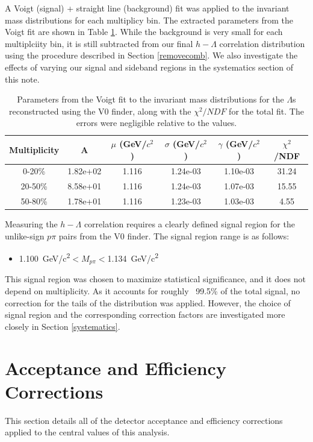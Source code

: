 \documentclass[ALICE,manyauthors]{ALICE_analysis_notes}
\begin{document}
 A Voigt (signal) + straight line (background) fit was applied to the invariant mass distributions for each multiplicy bin. The extracted parameters from the Voigt fit are shown in Table \ref{voigt_parameters}. While the background is very small for each multiplciity bin, it is still subtracted from our final $h-\Lambda$ correlation distribution using the procedure described in Section \ref{removecomb}. We also investigate the effects of varying our signal and sideband regions in the systematics section of this note.

\begin{table}[h!]
    \centering
\begin{tabular}{| c | c | c | c | c | c | }
\hline
Multiplicity & A & $\mu$ (GeV/$c^2$) & $\sigma$ (GeV/$c^2$) & $\gamma$ (GeV/$c^2$) & $\chi^2$/NDF \\
\hline
0-20\% & 1.82e+02  & 1.116 & 1.24e-03 & 1.10e-03 & 31.24\\
20-50\% & 8.58e+01 & 1.116 & 1.24e-03 & 1.07e-03 & 15.55\\
50-80\% & 1.78e+01 & 1.116 & 1.23e-03 & 1.03e-03 & 4.55\\
\hline
\end{tabular}
\caption{Parameters from the Voigt fit to the invariant mass distributions for the $\Lambda$s reconstructed using the V0 finder, along with the $\chi^2/NDF$ for the total fit. The errors were negligible relative to the values.}
\label{voigt_parameters}
\end{table}

 Measuring the $h-\Lambda$ correlation requires a clearly defined signal region for the unlike-sign $p\pi$ pairs from the V0 finder. The signal region range is as follows:

\begin{itemize}
	\item {}  \SI{1.100}{GeV/c^2}$< M_{p\pi} < $\SI{1.134}{GeV/c^2}
\end{itemize}

This signal region was chosen to maximize statistical significance, and it does not depend on multiplicity. As it accounts for roughly ~99.5\% of the total signal, no correction for the tails of the distribution was applied. However, the choice of signal region and the corresponding correction factors are investigated more closely in Section \ref{systematics}.

\section{Acceptance and Efficiency Corrections}
\label{efficiency_acceptance}
This section details all of the detector acceptance and efficiency corrections applied to the central values of this analysis.
\end{document}
